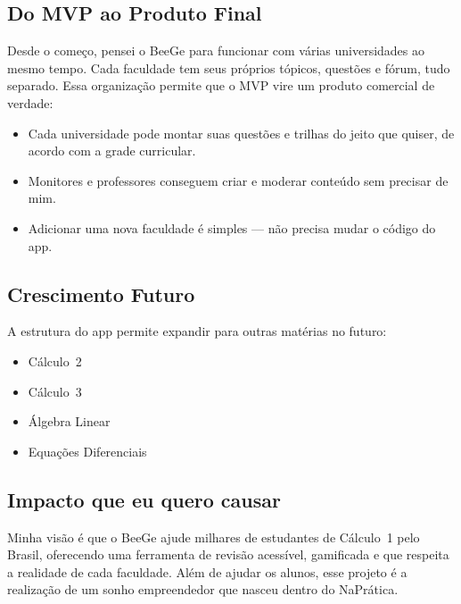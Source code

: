 \documentclass[12pt, a4paper]{article}
\begin{document}
\subsection{Do MVP ao Produto Final}

Desde o come\c{c}o, pensei o BeeGe para funcionar com v\'{a}rias universidades ao mesmo tempo. Cada faculdade tem seus pr\'{o}prios t\'{o}picos, quest\~{o}es e f\'{o}rum, tudo separado. Essa organiza\c{c}\~{a}o permite que o MVP vire um produto comercial de verdade:

\begin{itemize}[leftmargin=2cm]
  \item Cada universidade pode montar suas quest\~{o}es e trilhas do jeito que quiser, de acordo com a grade curricular.
  \item Monitores e professores conseguem criar e moderar conte\'{u}do sem precisar de mim.
  \item Adicionar uma nova faculdade \'{e} simples --- n\~{a}o precisa mudar o c\'{o}digo do app.
\end{itemize}

\subsection{Crescimento Futuro}

A estrutura do app permite expandir para outras mat\'{e}rias no futuro:

\begin{itemize}[leftmargin=2cm]
  \item C\'{a}lculo~2
  \item C\'{a}lculo~3
  \item \'{A}lgebra Linear
  \item Equa\c{c}\~{o}es Diferenciais
\end{itemize}

\subsection{Impacto que eu quero causar}

\begin{destaque}
Minha vis\~{a}o \'{e} que o BeeGe ajude milhares de estudantes de C\'{a}lculo~1 pelo Brasil, oferecendo uma ferramenta de revis\~{a}o acess\'{i}vel, gamificada e que respeita a realidade de cada faculdade. Al\'{e}m de ajudar os alunos, esse projeto \'{e} a realiza\c{c}\~{a}o de um sonho empreendedor que nasceu dentro do NaPr\'{a}tica.
\end{destaque}
\end{document}
